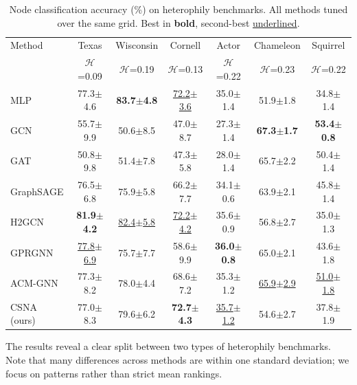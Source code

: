 \documentclass[runningheads]{llncs}
\begin{document}
\begin{table}[t]
\caption{Node classification accuracy (\%) on heterophily benchmarks. All methods tuned over the same grid. Best in \textbf{bold}, second-best \underline{underlined}.}\label{tab:results}
\centering
\setlength{\tabcolsep}{3.5pt}
\small
\begin{tabular}{lcccccc}
\toprule
Method & Texas & Wisconsin & Cornell & Actor & Chameleon & Squirrel \\
 & $\mathcal{H}$=0.09 & $\mathcal{H}$=0.19 & $\mathcal{H}$=0.13 & $\mathcal{H}$=0.22 & $\mathcal{H}$=0.23 & $\mathcal{H}$=0.22 \\
\midrule
MLP & 77.3{\tiny$\pm$4.6} & \textbf{83.7{\tiny$\pm$4.8}} & \underline{72.2{\tiny$\pm$3.6}} & 35.0{\tiny$\pm$1.4} & 51.9{\tiny$\pm$1.8} & 34.8{\tiny$\pm$1.4} \\
GCN & 55.7{\tiny$\pm$9.9} & 50.6{\tiny$\pm$8.5} & 47.0{\tiny$\pm$8.7} & 27.3{\tiny$\pm$1.4} & \textbf{67.3{\tiny$\pm$1.7}} & \textbf{53.4{\tiny$\pm$0.8}} \\
GAT & 50.8{\tiny$\pm$9.8} & 51.4{\tiny$\pm$7.8} & 47.3{\tiny$\pm$5.8} & 28.0{\tiny$\pm$1.4} & 65.7{\tiny$\pm$2.2} & 50.4{\tiny$\pm$1.4} \\
GraphSAGE & 76.5{\tiny$\pm$6.8} & 75.9{\tiny$\pm$5.8} & 66.2{\tiny$\pm$7.7} & 34.1{\tiny$\pm$0.6} & 63.9{\tiny$\pm$2.1} & 45.8{\tiny$\pm$1.4} \\
H2GCN & \textbf{81.9{\tiny$\pm$4.2}} & \underline{82.4{\tiny$\pm$5.8}} & \underline{72.2{\tiny$\pm$4.2}} & 35.6{\tiny$\pm$0.9} & 56.8{\tiny$\pm$2.7} & 35.0{\tiny$\pm$1.3} \\
GPRGNN & \underline{77.8{\tiny$\pm$6.9}} & 75.7{\tiny$\pm$7.7} & 58.6{\tiny$\pm$9.9} & \textbf{36.0{\tiny$\pm$0.8}} & 65.0{\tiny$\pm$2.1} & 43.6{\tiny$\pm$1.8} \\
ACM-GNN & 77.3{\tiny$\pm$8.2} & 78.0{\tiny$\pm$4.4} & 68.6{\tiny$\pm$7.2} & 35.3{\tiny$\pm$1.2} & \underline{65.9{\tiny$\pm$2.9}} & \underline{51.0{\tiny$\pm$1.8}} \\
\midrule
CSNA (ours) & 77.0{\tiny$\pm$8.3} & 79.6{\tiny$\pm$6.2} & \textbf{72.7{\tiny$\pm$4.3}} & \underline{35.7{\tiny$\pm$1.2}} & 54.6{\tiny$\pm$2.7} & 37.8{\tiny$\pm$1.9} \\
\bottomrule
\end{tabular}
\end{table}

The results reveal a clear split between two types of heterophily benchmarks.
Note that many differences across methods are within one standard deviation; we focus on patterns rather than strict mean rankings.
\end{document}
